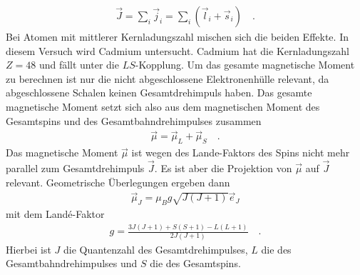 \begin{align}
	\vec{J} = \sum_i \vec{j}_i = \sum_i \left( \vec{l}_i + \vec{s}_i \right) \quad .
\end{align}
Bei Atomen mit mittlerer Kernladungszahl mischen sich die beiden Effekte. In diesem Versuch wird Cadmium untersucht. Cadmium hat die Kernladungszahl $Z = 48$ und fällt unter die $LS$-Kopplung. Um das gesamte magnetische Moment zu berechnen ist nur die nicht abgeschlossene Elektronenhülle relevant, da abgeschlossene Schalen keinen Gesamtdrehimpuls haben. Das gesamte magnetische Moment setzt sich also aus dem magnetischen Moment des Gesamtspins und des Gesamtbahndrehimpulses zusammen
\begin{align}
	\vec{\mu} = \vec{\mu}_L + \vec{\mu}_S  \quad .
\end{align}
Das magnetische Moment $\vec{\mu}$ ist wegen des Lande-Faktors des Spins nicht mehr parallel zum Gesamtdrehimpuls $\vec{J}$. Es ist aber die Projektion von $\vec{\mu}$ auf $\vec{J}$ relevant. Geometrische Überlegungen ergeben dann 
\begin{align}
	\vec{\mu}_J = \mu_B g \sqrt{J(J+1)} \vec{e}_J
\end{align}
mit dem Landé-Faktor
\begin{align}
g =	\frac{3J(J+1) + S(S+1) - L(L+1)}{2J(J+1)} \quad .
\end{align}
Hierbei ist $J$ die Quantenzahl des Gesamtdrehimpulses, $L$ die des Gesamtbahndrehimpulses und $S$ die des Gesamtspins.

